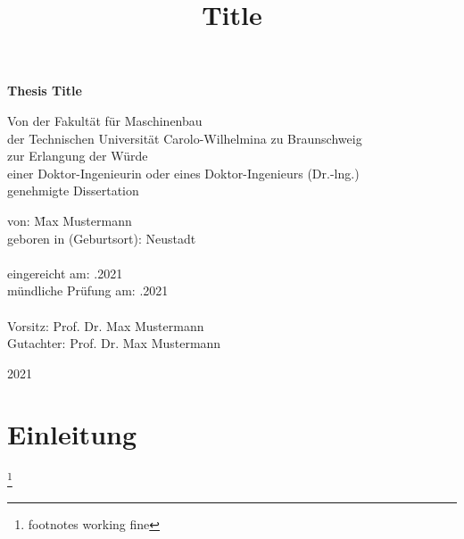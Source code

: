 \documentclass[12pt, a4paper, twoside, titlepage, showtrims]{scrbook} %
\title{Title}
\begin{document}
\begin{titlepage}
    \sffamily
   \begin{center}
       \vspace*{1cm}

       \textbf{Thesis Title}

       \vspace{1.5cm}
        Von der Fakultät für Maschinenbau \\
        der Technischen Universität Carolo-Wilhelmina zu Braunschweig \\
        \vspace{0.5cm}
        zur Erlangung der Würde \\
        \vspace{0.5cm}
        einer Doktor-Ingenieurin oder eines Doktor-Ingenieurs (Dr.-lng.) \\
        \vspace{0.5cm}
        genehmigte Dissertation
        


       \vfill
            
    \begin{flushleft}
    \begin{tabbing}
        von: \hspace*{9em} \= Max Mustermann \\
        geboren in (Geburtsort): \> Neustadt \\ \\
        eingereicht am: .2021 \\
        mündliche Prüfung am: .2021 \\ \\
        Vorsitz: \> Prof. Dr. Max Mustermann\\
        Gutachter: \>  Prof. Dr. Max Mustermann
    \end{tabbing}
    \end{flushleft}
        \vspace{2.5cm}
        2021
        \vspace{1.5cm}
            
   \end{center}
\end{titlepage}


\tableofcontents

\chapter{Einleitung}
\footnote{footnotes working fine}
\lipsum[3-10]
\end{document}
